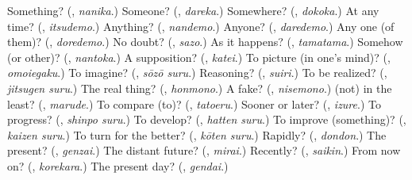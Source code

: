 \begin{tcolorbox}[breakable,colback=teal!4,colframe=teal!35!black,title={Before you move on}]
Something? (\textbf{}, \emph{nanika}.) Someone? (\textbf{}, \emph{dareka}.) Somewhere? (\textbf{}, \emph{dokoka}.) At any time? (\textbf{}, \emph{itsudemo}.) Anything? (\textbf{}, \emph{nandemo}.) Anyone? (\textbf{}, \emph{daredemo}.) Any one (of them)? (\textbf{}, \emph{doredemo}.) No doubt? (\textbf{}, \emph{sazo}.) As it happens? (\textbf{}, \emph{tamatama}.) Somehow (or other)? (\textbf{}, \emph{nantoka}.) A supposition? (\textbf{}, \emph{katei}.) To picture (in one's mind)? (\textbf{}, \emph{omoiegaku}.) To imagine? (\textbf{}, \emph{sōzō suru}.) Reasoning? (\textbf{}, \emph{suiri}.) To be realized? (\textbf{}, \emph{jitsugen suru}.) The real thing? (\textbf{}, \emph{honmono}.) A fake? (\textbf{}, \emph{nisemono}.) (not) in the least? (\textbf{}, \emph{marude}.) To compare (to)? (\textbf{}, \emph{tatoeru}.) Sooner or later? (\textbf{}, \emph{izure}.) To progress? (\textbf{}, \emph{shinpo suru}.) To develop? (\textbf{}, \emph{hatten suru}.) To improve (something)? (\textbf{}, \emph{kaizen suru}.) To turn for the better? (\textbf{}, \emph{kōten suru}.) Rapidly? (\textbf{}, \emph{dondon}.) The present? (\textbf{}, \emph{genzai}.) The distant future? (\textbf{}, \emph{mirai}.) Recently? (\textbf{}, \emph{saikin}.) From now on? (\textbf{}, \emph{korekara}.) The present day? (\textbf{}, \emph{gendai}.)
\end{tcolorbox}
